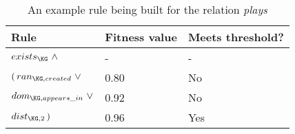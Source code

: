 \begin{table}
    \begin{center}
    \begin{tabular}{ M{4cm} | M{1.9cm} | M{2.5cm} } 
    \centering \textbf{Rule} & \textbf{Fitness value} & \textbf{Meets threshold?} \\
    \hline
    $exists_{\KG}~\wedge$ & - & - \\ \hline 
    $(\,ran_{\KG, created}~\vee$ & 0.80 & No \\ \hline 
    $dom_{\KG, appears\_in}~\vee$ & 0.92 & No \\ \hline 
    $dist_{\KG, 2}\,)$ & 0.96 & Yes \\ \hline 
    \end{tabular}
    \caption{An example rule being built for the relation \textit{plays}}\label{table:chai-iterations}
    \end{center}
\end{table}